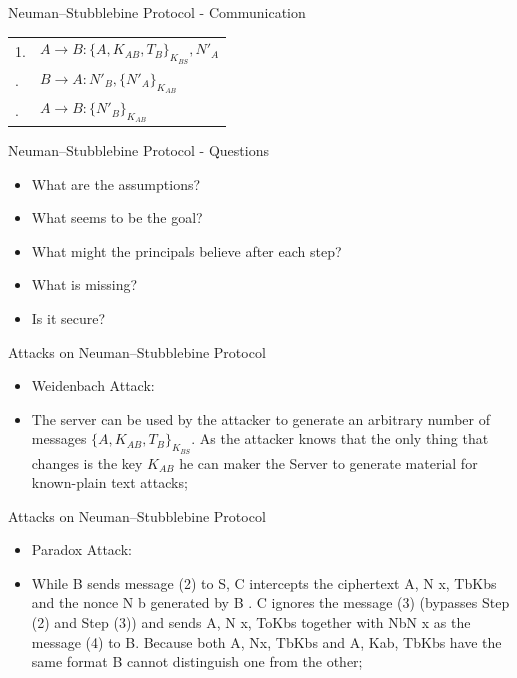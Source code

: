 \documentclass[12pt,table,xcolor={dvipsnames}]{beamer}
\begin{document}
\begin{frame}{Neuman–Stubblebine Protocol - Communication}
\begin{table}[htdp]
\begin{center}
\begin{tabular}{ l l }
1. & $A\rightarrow B: \{A,K_{AB},T_{B}\}_{K_{BS}},N'_{A}$ \\\pause
2. & $B\rightarrow A: N'_{B},\{N'_{A}\}_{K_{AB}}$ \\\pause
3. & $A\rightarrow B: \{N'_{B}\}_{K_{AB}}$ 
\end{tabular}
\end{center}
\end{table}%
\end{frame}


\begin{frame}{Neuman–Stubblebine Protocol - Questions}
\begin{itemize}
\item What are the assumptions? \pause
\item What seems to be the goal?\pause 
\item What might the principals believe after each step?\pause
\item What is missing?\pause
\item Is it secure?
\end{itemize}
\end{frame}

\begin{frame}{Attacks on Neuman–Stubblebine Protocol}
\begin{itemize}
\item Weidenbach Attack:
\item The server can be used by the attacker to generate an arbitrary number of messages $\{A,K_{AB},T_{B}\}_{K_{BS}}$. As the attacker knows that the only thing that changes is the key $K_{AB}$ he can maker the Server to generate material for known-plain text attacks;
\end{itemize}
\end{frame}

\begin{frame}{Attacks on Neuman–Stubblebine Protocol}
\begin{itemize}
\item Paradox Attack:
\item While B sends message (2) to S, C intercepts the ciphertext {A, N x, Tb}Kbs and the nonce N b generated by B . C ignores the message (3) (bypasses Step (2) and Step (3)) and sends {A, N x, To}Kbs together with {Nb}N x as the message (4) to B. Because both
{A, Nx, Tb}Kbs and {A, Kab, Tb}Kbs have the same format  B cannot distinguish one from the other;
\end{itemize}
\end{frame}
\end{document}
